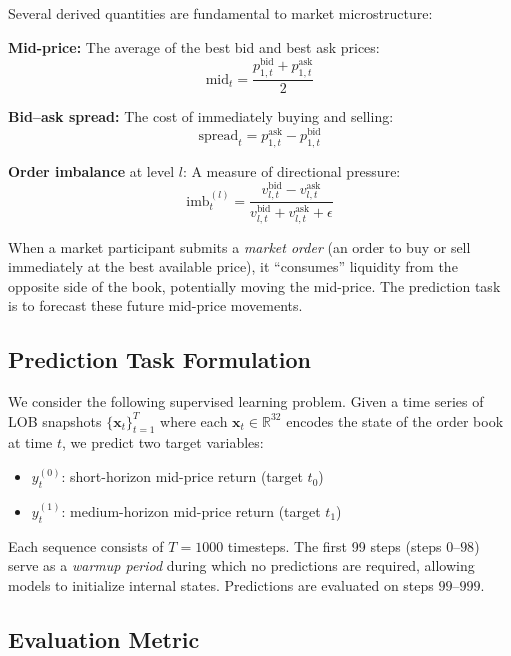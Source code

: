 \documentclass[11pt,a4paper]{article}
\newcommand{\R}{\mathbb{R}}
\newcommand{\bx}{\mathbf{x}}
\begin{document}
Several derived quantities are fundamental to market microstructure:

\textbf{Mid-price:} The average of the best bid and best ask prices:
\begin{equation}
    \text{mid}_t = \frac{p_{1,t}^{\text{bid}} + p_{1,t}^{\text{ask}}}{2}
    \label{eq:mid}
\end{equation}

\textbf{Bid--ask spread:} The cost of immediately buying and selling:
\begin{equation}
    \text{spread}_t = p_{1,t}^{\text{ask}} - p_{1,t}^{\text{bid}}
    \label{eq:spread}
\end{equation}

\textbf{Order imbalance} at level $l$: A measure of directional pressure:
\begin{equation}
    \text{imb}_t^{(l)} = \frac{v_{l,t}^{\text{bid}} - v_{l,t}^{\text{ask}}}{v_{l,t}^{\text{bid}} + v_{l,t}^{\text{ask}} + \epsilon}
    \label{eq:imbalance}
\end{equation}

When a market participant submits a \emph{market order} (an order to buy or sell immediately at the best available price), it ``consumes'' liquidity from the opposite side of the book, potentially moving the mid-price. The prediction task is to forecast these future mid-price movements.

\subsection{Prediction Task Formulation}

We consider the following supervised learning problem. Given a time series of LOB snapshots $\{\bx_t\}_{t=1}^{T}$ where each $\bx_t \in \R^{32}$ encodes the state of the order book at time $t$, we predict two target variables:
\begin{itemize}[itemsep=0.1em]
    \item $y_t^{(0)}$: short-horizon mid-price return (target $t_0$)
    \item $y_t^{(1)}$: medium-horizon mid-price return (target $t_1$)
\end{itemize}

Each sequence consists of $T = 1000$ timesteps. The first 99 steps (steps $0$--$98$) serve as a \emph{warmup period} during which no predictions are required, allowing models to initialize internal states. Predictions are evaluated on steps $99$--$999$.

\subsection{Evaluation Metric}
\end{document}
